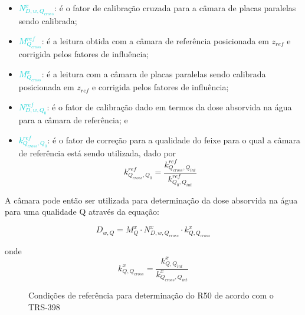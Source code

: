 \documentclass[11pt,a4paper]{article}
\newcounter{exemplo}
\begin{document}
	\begin{exemplo}[onde:]
		\begin{itemize}[label=\textcolor{CarnationPink}{$\star$}]
			\item \textcolor{DarkTurquoise}{$N_{D,w,Q_{cross}}^{x}$}: é o fator de calibração cruzada para a câmara de placas paralelas sendo calibrada;
			\item \textcolor{DarkTurquoise}{$M_{Q_{cross}}^{ref}$}: é a leitura obtida com a câmara de referência posicionada em $z_{ref}$ e corrigida pelos fatores de influência;
			\item \textcolor{DarkTurquoise}{$M_{Q_{cross}}^{x}$}: é a leitura com a câmara de placas paralelas sendo calibrada posicionada em $z_{ref}$ e corrigida pelos fatores de influência;
			\item \textcolor{DarkTurquoise}{$N_{D,w,Q_0}^{ref}$}: é o fator de calibração dado em termos da dose absorvida na água para a câmara de referência; e
			\item \textcolor{DarkTurquoise}{$ k_{Q_{cross},Q_0}^{ref}$}: é o fator de correção para a qualidade do feixe para o qual a câmara de referência está sendo utilizada, dado por $$k_{Q_{cross},Q_0}^{ref} = \frac{k_{Q_{cross},Q_{int}}^{ref}}{k_{Q_0, Q_{int}}^{ref}}$$
		\end{itemize}
	\end{exemplo}

	A câmara pode então ser utilizada para determinação da dose absorvida na água para uma qualidade Q através da equação:

	$$D_{w,Q} = M_{Q}^{x}\cdot N_{D,w,Q_{cross}}^{x} \cdot k_{Q,Q_{cross}}^{x} $$

	onde $$k_{Q,Q_{cross}}^{x} = \frac{k_{Q,Q_{int}}^{x}}{k_{Q_{cross}, Q_{int}}^{x}}$$

	\begin{figure}[h]
		\centering
		\caption{Condições de referência para determinação do R50 de acordo com o TRS-398}
		\label{fig:condicoesReferenciasR50}
	\end{figure}
\end{document}
